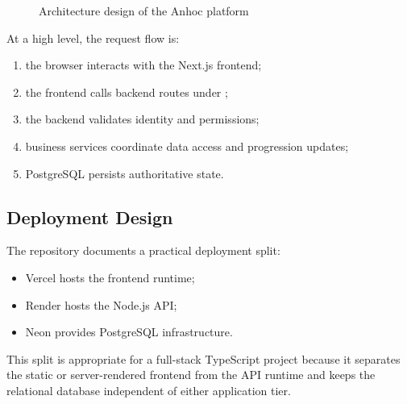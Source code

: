 \begin{figure}[H]
{
}
\caption{Architecture design of the Anhoc platform}
\label{fig:user-flow}
\end{figure}

At a high level, the request flow is:
\begin{enumerate}
  \item the browser interacts with the Next.js frontend;
  \item the frontend calls backend routes under ;
  \item the backend validates identity and permissions;
  \item business services coordinate data access and progression updates;
  \item PostgreSQL persists authoritative state.
\end{enumerate}

\subsection{Deployment Design}

The repository documents a practical deployment split:
\begin{itemize}
  \item Vercel hosts the frontend runtime;
  \item Render hosts the Node.js API;
  \item Neon provides PostgreSQL infrastructure.
\end{itemize}

This split is appropriate for a full-stack TypeScript project because it separates the static or server-rendered frontend from the API runtime and keeps the relational database independent of either application tier.

